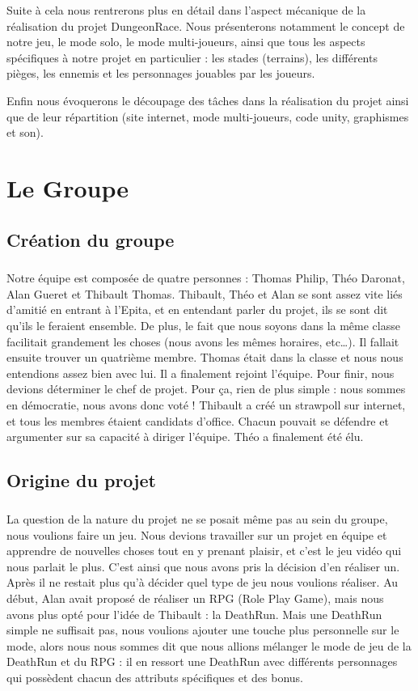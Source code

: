 \documentclass[12pt]{report}
\begin{document}
	Suite à cela nous rentrerons plus en détail dans l’aspect mécanique de la réalisation du projet DungeonRace. Nous présenterons notamment  le concept de notre jeu, le mode solo, le mode multi-joueurs, ainsi que tous les aspects spécifiques à notre projet en particulier : les stades (terrains), les différents pièges, les ennemis et les personnages jouables par les joueurs. 

	Enfin nous évoquerons le découpage des tâches dans la réalisation du projet ainsi que de leur répartition (site internet, mode multi-joueurs, code unity, graphismes et son). 
	
\chapter{Le Groupe}
	
	\section{Création du groupe}
	\paragraph{}
	Notre équipe est composée de quatre personnes : Thomas Philip, Théo Daronat, Alan Gueret et Thibault Thomas. 
Thibault, Théo et Alan se sont assez vite liés d'amitié en entrant à l'Epita, et en entendant parler du projet, ils se sont dit qu'ils le feraient ensemble. De plus, le fait que nous soyons dans la même classe facilitait grandement les choses (nous avons les mêmes horaires, etc…). Il fallait ensuite trouver un quatrième membre. Thomas était dans la classe et nous nous entendions assez bien avec lui. Il a finalement rejoint l'équipe. 
Pour finir, nous devions déterminer le chef de projet. Pour ça, rien de plus simple : nous sommes en démocratie, nous avons donc voté ! Thibault a créé un strawpoll sur internet, et tous les membres étaient candidats d'office. Chacun pouvait se défendre et argumenter sur sa capacité à diriger l'équipe. Théo a finalement été élu. 

	\section{Origine du projet}
	\paragraph{}
	La question de la nature du projet ne se posait même pas au sein du groupe, nous voulions faire un jeu. Nous devions travailler sur un projet en équipe et apprendre de nouvelles choses tout en y prenant plaisir, et c'est le jeu vidéo qui nous parlait le plus. C'est ainsi que nous avons pris la décision d'en réaliser un. Après il ne restait plus qu'à décider quel type de jeu nous voulions réaliser. Au début, Alan avait proposé de réaliser un RPG (Role Play Game), mais nous avons plus opté pour l'idée de Thibault : la DeathRun. Mais une DeathRun simple ne suffisait pas, nous voulions ajouter une touche plus personnelle sur le mode, alors nous nous sommes dit que nous allions mélanger le mode de jeu de la DeathRun et du RPG : il en ressort une DeathRun avec différents personnages qui possèdent chacun des attributs spécifiques et des bonus.
	
\end{document}
